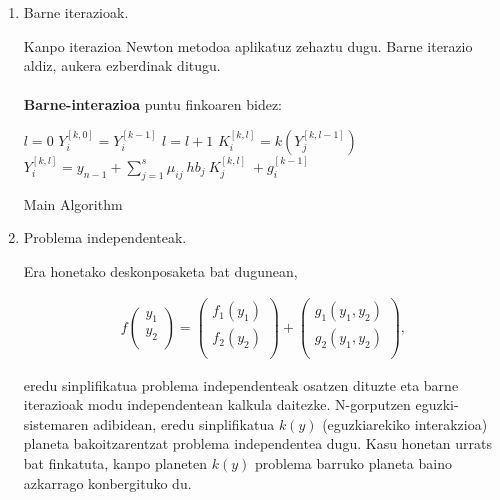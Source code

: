 \begin{enumerate}
\item Barne iterazioak.

Kanpo iterazioa Newton metodoa aplikatuz zehaztu dugu. Barne iterazio aldiz, aukera ezberdinak ditugu.

\paragraph*{} \textbf{Barne-interazioa} puntu finkoaren bidez:

\begin{algorithm}[H]
 \BlankLine
  $l=0$\;
  $Y_i^{[k,0]}=Y_i^{[k-1]}$\;
  {
   \BlankLine
   $l=l+1$\;  
   \BlankLine
   $K_i^{[k,l]}=k(Y_{j}^{[k,l-1]})$\;
   $Y_i^{[k,l]}=y_{n-1}+ \sum\limits_{j=1}^{s} \mu_{ij} \ hb_j \ K_j^{[k,l]} \ +g_{i}^{[k-1]} $\;
  }
 \caption{Main Algorithm}
\end{algorithm}


\item Problema independenteak.

Era honetako deskonposaketa bat dugunean,

\begin{align*}
f\left ( \begin{array}{c}
   y_1 \\
   y_2 \\
\end{array} \right)=
\left ( \begin{array}{c}
   f_1(y_1) \\
   f_2(y_2) \\
\end{array} \right)+
\left ( \begin{array}{c}
   g_1(y_1,y_2) \\
   g_2(y_1,y_2) \\
\end{array} \right),
\end{align*}

eredu sinplifikatua problema independenteak osatzen dituzte eta barne iterazioak modu independentean kalkula daitezke. N-gorputzen eguzki-sistemaren adibidean, eredu sinplifikatua $k(y)$ (eguzkiarekiko interakzioa) planeta bakoitzarentzat problema independentea dugu. Kasu honetan urrats bat finkatuta, kanpo planeten $k(y)$ problema barruko planeta baino azkarrago konbergituko du. 

\end{enumerate}


